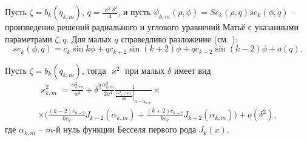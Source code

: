 Пусть $\zeta = b_k(q_{k,m})$, $q=\frac{\varkappa^2 \delta^2}{4}$, и пусть 
$\psi_{k,m}(\rho, \phi) = Se_k(\rho, q)se_k(\phi, q)$ -- произведение решений радиального и углового уравнений Матьё с указанными параметрами $\zeta, q$. Для малых $q$ справедливо разложение (см. \cite[\S~2.2, с.~122---124]{wref12}):
$$se_k(\phi, q) = c_k \sin{k \phi} + q c_{k+2} \sin{(k+2) \phi} +q c_{k-2} \sin{(k-2) \phi} + o(q).$$ 
\begin{lemma}
Пусть $\zeta = b_k(q_{k, m})$, тогда $\varkappa^2$ при малых $\delta$ имеет вид
\begin{multline*}
\varkappa_{k, m}^2 = 
\frac{\alpha_{k, m}^2}{a^2} +  \delta^2 \frac{\alpha_{k, m}^3}{2 a^4}\frac{1}{\left.\frac{\partial J_{k} (u)}{\partial u}\right|_{u=\alpha_{k, m}}} \times \\ \times
\biggl(
\frac{(k-2)c_{k-2}}{k c_k} J_{k-2}(\alpha_{k, m}) + \frac{(k+2)c_{k+2} }{k c_k} J_{k+2}(\alpha_{k, m})
\biggr) + o(\delta^2),
\end{multline*}
где $\alpha_{k, m}$ -- $m$-й нуль функции Бесселя первого рода $J_{k}(x)$.
\label{th:lemEllipse2}
\end{lemma}
